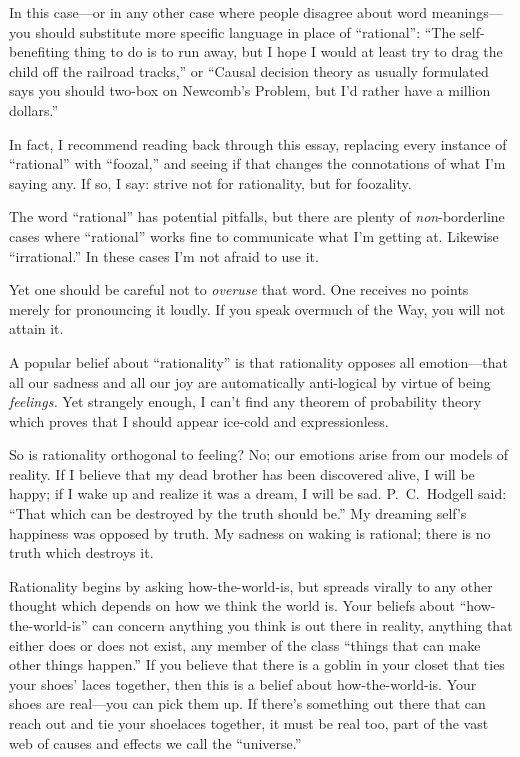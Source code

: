 {
 In this case---or in any other case where people disagree about
word meanings---you should substitute more specific language in place
of ``rational'':
``The self-benefiting thing to do is to run away, but
I hope I would at least try to drag the child off the railroad
tracks,'' or ``Causal decision
theory as usually formulated says you should two-box on
Newcomb's Problem, but I'd rather have
a million dollars.''}

{
 In fact, I recommend reading back through this essay, replacing
every instance of ``rational'' with
``foozal,'' and seeing if that
changes the connotations of what I'm saying any. If so,
I say: strive not for rationality, but for foozality.}

{
 The word ``rational'' has
potential pitfalls, but there are plenty of \textit{non}{}-borderline
cases where ``rational'' works fine
to communicate what I'm getting at. Likewise
``irrational.'' In these cases
I'm not afraid to use it.}

{
 Yet one should be careful not to \textit{overuse} that word. One
receives no points merely for pronouncing it loudly. If you speak
overmuch of the Way, you will not attain it.}

\myendsectiontext


\bigskip


{
 A popular belief about
``rationality'' is that rationality
opposes all emotion---that all our sadness and all our joy are
automatically anti-logical by virtue of being \textit{feelings.} Yet
strangely enough, I can't find any theorem of
probability theory which proves that I should appear ice-cold and
expressionless. }

{
 So is rationality orthogonal to feeling? No; our emotions arise
from our models of reality. If I believe that my dead brother has been
discovered alive, I will be happy; if I wake up and realize it was a
dream, I will be sad. P.~C.~Hodgell said: ``That which
can be destroyed by the truth should be.'' My
dreaming self's happiness was opposed by truth. My
sadness on waking is rational; there is no truth which destroys it.}

{
 Rationality begins by asking how-the-world-is, but spreads virally
to any other thought which depends on how we think the world is. Your
beliefs about ``how-the-world-is''
can concern anything you think is out there in reality, anything that
either does or does not exist, any member of the class
``things that can make other things
happen.'' If you believe that there is a goblin in
your closet that ties your shoes' laces together, then
this is a belief about how-the-world-is. Your shoes are real---you can
pick them up. If there's something out there that can
reach out and tie your shoelaces together, it must be real too, part of
the vast web of causes and effects we call the
``universe.''}

